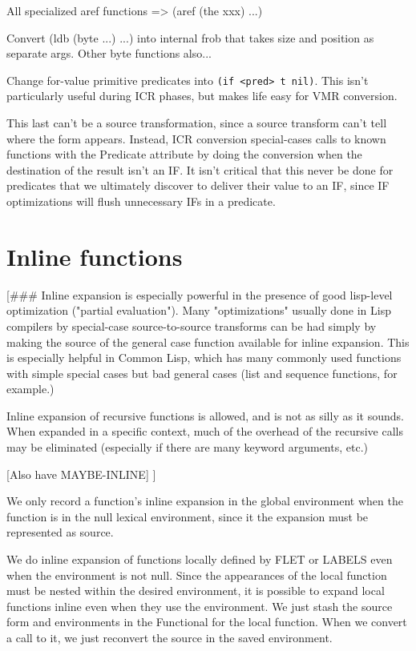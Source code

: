 All specialized aref functions => (aref (the xxx) ...)

Convert (ldb (byte ...) ...) into internal frob that takes size and position as
separate args.  Other byte functions also...

Change for-value primitive predicates into \verb+(if <pred> t nil)+.  This isn't
particularly useful during ICR phases, but makes life easy for VMR conversion.

This last can't be a source transformation, since a source transform can't tell
where the form appears.  Instead, ICR conversion special-cases calls to known
functions with the Predicate attribute by doing the conversion when the
destination of the result isn't an IF.  It isn't critical that this never be
done for predicates that we ultimately discover to deliver their value to an
IF, since IF optimizations will flush unnecessary IFs in a predicate.


\section{Inline functions}

[\#\#\# Inline expansion is especially powerful in the presence of good lisp-level
optimization ("partial evaluation").  Many "optimizations" usually done in Lisp
compilers by special-case source-to-source transforms can be had simply by
making the source of the general case function available for inline expansion.
This is especially helpful in Common Lisp, which has many commonly used
functions with simple special cases but bad general cases (list and sequence
functions, for example.)

Inline expansion of recursive functions is allowed, and is not as silly as it
sounds.  When expanded in a specific context, much of the overhead of the
recursive calls may be eliminated (especially if there are many keyword
arguments, etc.)

[Also have MAYBE-INLINE]
]

We only record a function's inline expansion in the global environment when the
function is in the null lexical environment, since it the expansion must be
represented as source.

We do inline expansion of functions locally defined by FLET or LABELS even when
the environment is not null.  Since the appearances of the local function must
be nested within the desired environment, it is possible to expand local
functions inline even when they use the environment.  We just stash the source
form and environments in the Functional for the local function.  When we
convert a call to it, we just reconvert the source in the saved environment.

